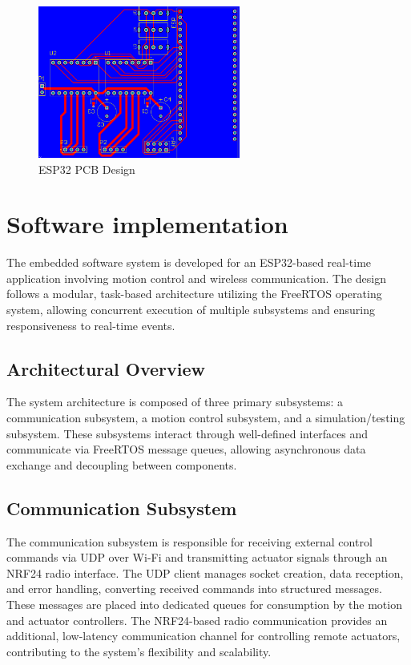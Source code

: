 \begin{figure}[h]
	\centering\includegraphics[height=5cm]{./images/ESP32_pcb}
	\caption{ESP32 PCB Design}
\end{figure}


\section{Software implementation}

The embedded software system is developed for an ESP32-based real-time application involving motion control and wireless communication. The design follows a modular, task-based architecture utilizing the FreeRTOS operating system, allowing concurrent execution of multiple subsystems and ensuring responsiveness to real-time events.

\subsection{Architectural Overview}
The system architecture is composed of three primary subsystems: a communication subsystem, a motion control subsystem, and a simulation/testing subsystem. These subsystems interact through well-defined interfaces and communicate via FreeRTOS message queues, allowing asynchronous data exchange and decoupling between components.

\subsection{Communication Subsystem}
The communication subsystem is responsible for receiving external control commands via UDP over Wi-Fi and transmitting actuator signals through an NRF24 radio interface. The UDP client manages socket creation, data reception, and error handling, converting received commands into structured messages. These messages are placed into dedicated queues for consumption by the motion and actuator controllers. The NRF24-based radio communication provides an additional, low-latency communication channel for controlling remote actuators, contributing to the system's flexibility and scalability.

